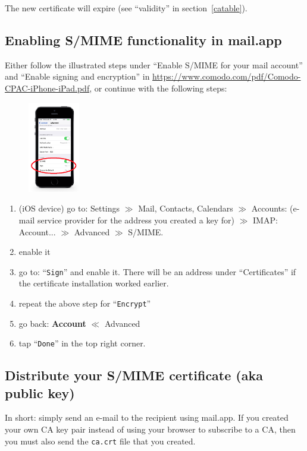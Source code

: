 \documentclass[pdftex,12pt,titlepage=false]{scrartcl}
\begin{document}
The new certificate will expire (see ``validity'' in section~\ref{catable}).

\subsection{Enabling S/MIME functionality in mail.app}\label{smime_enable}
Either follow the illustrated steps under ``Enable S/MIME for your
mail account'' and ``Enable signing and encryption'' in
\url{https://www.comodo.com/pdf/Comodo-CPAC-iPhone-iPad.pdf}, or
continue with the following steps:\\[-2em]%
\begin{figure}%
  \includegraphics[width=0.2\textwidth]{images/mailapp_smime_settings_indicated.png}
\end{figure}%
\begin{enumerate}%
\item (iOS device) go to: Settings $\gg$ Mail, Contacts, Calendars
  $\gg$ Accounts: (e-mail service provider for the address you created
  a key for) $\gg$ IMAP: Account... $\gg$ Advanced $\gg$ S/MIME.
\item enable it
\item go to: ``\verb|Sign|'' and enable it.  There will be an address under
  ``Certificates'' if the certificate installation worked earlier.
\item repeat the above step for ``\verb|Encrypt|''
\item go back: \textbf{Account} $\ll$ Advanced
\item tap ``\verb|Done|'' in the top right corner.
\end{enumerate}

\subsection{Distribute your S/MIME certificate (aka public key)}
In short: simply send an e-mail to the recipient using mail.app.  If
you created your own CA key pair instead of using your browser to
subscribe to a CA, then you must also send the \verb|ca.crt| file
that you created.\\
\end{document}
